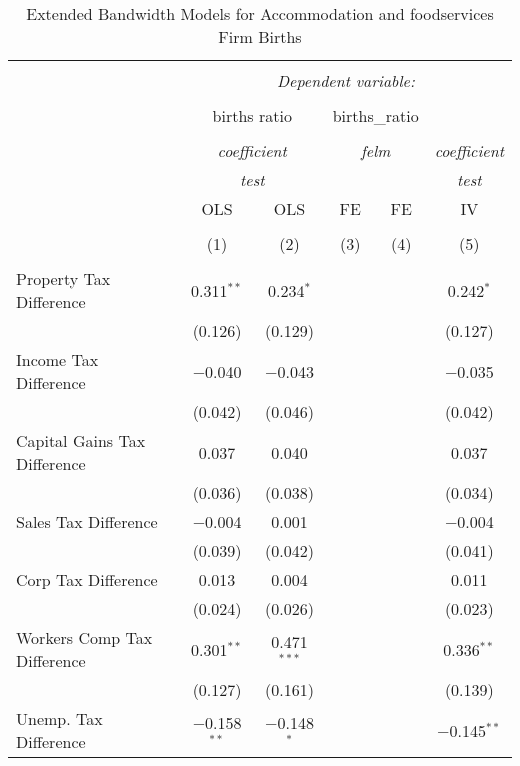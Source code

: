 
\begin{table}[!htbp] \centering 
  \caption{Extended Bandwidth Models for  Accommodation and foodservices Firm Births} 
  \label{} 
\begin{tabular}{@{\extracolsep{5pt}}lccccc} 
\\[-1.8ex]\hline 
\hline \\[-1.8ex] 
 & \multicolumn{5}{c}{\textit{Dependent variable:}} \\ 
\cline{2-6} 
\\[-1.8ex] & \multicolumn{2}{c}{births ratio} & \multicolumn{2}{c}{births\_ratio} &   \\ 
\\[-1.8ex] & \multicolumn{2}{c}{\textit{coefficient}} & \multicolumn{2}{c}{\textit{felm}} & \textit{coefficient} \\ 
 & \multicolumn{2}{c}{\textit{test}} & \multicolumn{2}{c}{\textit{}} & \textit{test} \\ 
 & OLS & OLS & FE & FE & IV \\ 
\\[-1.8ex] & (1) & (2) & (3) & (4) & (5)\\ 
\hline \\[-1.8ex] 
 Property Tax Difference & 0.311$^{**}$ & 0.234$^{*}$ &  &  & 0.242$^{*}$ \\ 
  & (0.126) & (0.129) &  &  & (0.127) \\ 
  Income Tax Difference & $-$0.040 & $-$0.043 &  &  & $-$0.035 \\ 
  & (0.042) & (0.046) &  &  & (0.042) \\ 
  Capital Gains Tax Difference & 0.037 & 0.040 &  &  & 0.037 \\ 
  & (0.036) & (0.038) &  &  & (0.034) \\ 
  Sales Tax Difference & $-$0.004 & 0.001 &  &  & $-$0.004 \\ 
  & (0.039) & (0.042) &  &  & (0.041) \\ 
  Corp Tax Difference & 0.013 & 0.004 &  &  & 0.011 \\ 
  & (0.024) & (0.026) &  &  & (0.023) \\ 
  Workers Comp Tax Difference & 0.301$^{**}$ & 0.471$^{***}$ &  &  & 0.336$^{**}$ \\ 
  & (0.127) & (0.161) &  &  & (0.139) \\ 
  Unemp. Tax Difference & $-$0.158$^{**}$ & $-$0.148$^{*}$ &  &  & $-$0.145$^{**}$ \\ 

\end{tabular}
\end{table}
